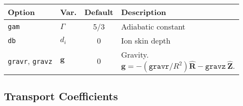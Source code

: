 \documentclass[letterpaper]{book}
\renewcommand{\vec}[1]{\ensuremath{\mathbf{#1}}}
\newcommand{\uvec}[1]{\ensuremath{\vec{\hat{#1}}}}
\begin{document}
\begin{tabular}{llcl}
  \textbf{Option}&\textbf{Var.}&\textbf{Default}&\textbf{Description}\\
  \hline
  \texttt{gam}    & $\Gamma$& 5/3 & Adiabatic constant\\
  \texttt{db}     & $d_i$   & 0   & Ion skin depth\\
  \texttt{gravr}, \texttt{gravz} & \vec{g} & 0 & \parbox[t]{1.8in}{Gravity.\\
                       $\vec{g} = -(\mathtt{gravr}/R^2) \uvec{R} 
                                  - \mathtt{gravz}\ \uvec{Z}$.}
\end{tabular}


\subsection{Transport Coefficients}
\end{document}
